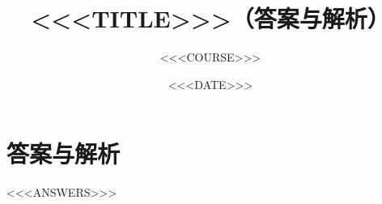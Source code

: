 \documentclass[11pt]{ctexart}
\title{<<<TITLE>>>（答案与解析）}
\author{<<<COURSE>>>}
\date{<<<DATE>>>}
\begin{document}
\maketitle

\section*{答案与解析}
<<<ANSWERS>>>
\end{document}
